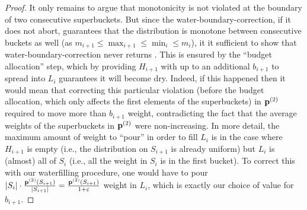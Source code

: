 \begin{proof}
It only remains to argue that monotonicity is not violated at the boundary of two consecutive superbuckets. But since the \textsf{water-boundary-correction}, if it does not abort, guarantees that the distribution is monotone between consecutive buckets as well (as $m_{i+1}\leq \max_{i+1}\leq \min_i \leq m_i$), it it sufficient to show that \textsf{water-boundary-correction} never returns \fail. This is ensured by the ``budget allocation'' step, which by providing $H_{i+1}$ with up to an additional $b_{i+1}$ to spread into $L_i$ guarantees it will become dry. Indeed, if this happened then it would mean that correcting this particular violation (before the budget allocation, which only affects the first elements of the superbuckets) in $\mathbf{p}^{(2)}$ required to move more than $b_{i+1}$ weight, contradicting the fact that the average weights of the superbuckets in $\mathbf{p}^{(2)}$ were non-increasing. In more detail, the maximum amount of weight to ``pour'' in order to fill $L_i$ is in the case where $H_{i+1}$ is empty (i.e., the distribution on $S_{i+1}$ is already uniform) but $L_i$ is (almost) all of $S_i$ (i.e., all the weight in $S_i$ is in the first bucket). To correct this with our waterfilling procedure, one would have to pour $\left\lvert S_i \right\rvert\cdot \frac{\mathbf{p}^{(2)}(S_{i+1})}{\left\lvert S_{i+1} \right\rvert}=\frac{\mathbf{p}^{(2)}(S_{i+1})}{1+\varepsilon}$ weight in $L_i$, which is exactly our choice of value for $b_{i+1}$.
\end{proof}

